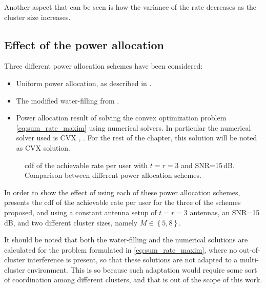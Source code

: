 Another aspect that can be seen is how the variance of the rate decreases as the
cluster size increases.

\subsection{Effect of the power allocation}\label{ssec:stats_power_alloc}

Three different power allocation schemes have been considered:

\begin{itemize}
   \item Uniform power allocation, as described in
      .
   \item The modified water-filling from .
   \item Power allocation result of solving the convex optimization
      problem \eqref{eq:sum_rate_maxim} using numerical solvers. In particular
      the numerical solver used is CVX \cite{cvx}, \cite{gb08}. For the rest of
      the chapter, this solution will be noted as CVX solution.
\end{itemize}

\begin{figure}[t]
\begin{center}
   \dummybox
\end{center}
\caption{\gls{cdf} of the achievable rate per user with $t=r=3$ and SNR=15\,dB.
Comparison between different power allocation schemes.}
\label{fig:cdf_power_alloc}
\end{figure}

In order to show the effect of using each of these power allocation schemes,
 presents the \gls{cdf} of the achievable rate per
user for the three of the schemes proposed, and using a constant antenna setup
of $t = r = 3$ antennas, an SNR=15\,dB, and two different cluster sizes, namely
$M \in \left\{5, 8\right\}$.

It should be noted that both the water-filling and the numerical solutions are
calculated for the problem formulated in \eqref{eq:sum_rate_maxim}, where no
out-of-cluster interference is present, so that these solutions are not adapted
to a multi-cluster environment. This is so because such adaptation would require
some sort of coordination among different clusters, and that is out of the scope
of this work.

